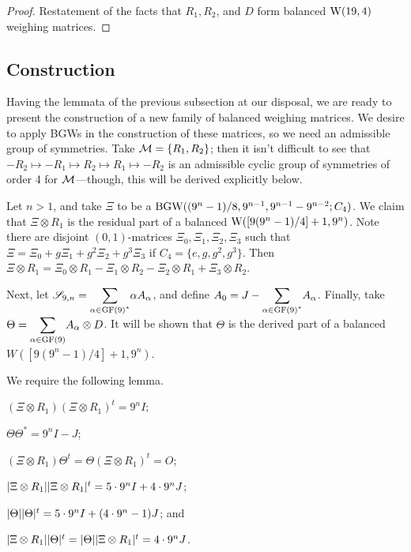 \documentclass[../../../main]{subfiles}
\begin{document}
 \begin{proof}
  Restatement of the facts that $R_1,R_2$, and $D$ form balanced $\text{W}(19,4)$ weighing matrices.
 \end{proof}
 
 \dinkus
 
\subsection{Construction}

Having the lemmata of the previous subsection at our disposal, we are ready to present the construction of a new family of balanced weighing matrices. We desire to apply BGWs in the construction of these matrices, so we need an admissible group of symmetries. Take $\mathcal{M}=\{R_1,R_2\}$; then it isn't difficult to see that $-R_2 \mapsto -R_1 \mapsto R_2 \mapsto R_1 \mapsto -R_2$ is an admissible cyclic group of symmetries of order 4 for $\mathcal{M}$---though, this will be derived explicitly below.

Let $n>1$, and take $\Xi$ to be a $\text{BGW}((9^n-1)/8,9^{n-1},9^{n-1}-9^{n-2};C_4)$. We claim that $\Xi \otimes R_1$ is the residual part of a balanced $\text{W}([9(9^n-1)/4]+1,9^n)$. Note there are disjoint $(0,1)$-matrices $\Xi_0,\Xi_1,\Xi_2,\Xi_3$ such that $\Xi = \Xi_0 + g\Xi_1 + g^2\Xi_2 + g^3\Xi_3$ if $C_4=\{e,g,g^2,g^3\}$. Then $\Xi \otimes R_1 = \Xi_0 \otimes R_1 - \Xi_1 \otimes R_2 - \Xi_2 \otimes R_1 + \Xi_3 \otimes R_2$.

Next, let $\simplex_{9,n}=\ssum_{\alpha\in\gf(9)^*}\alpha A_\alpha$, and define $A_0=J-\ssum_{\alpha\in\gf(9)^*}A_\alpha$. Finally, take $\Theta = \ssum_{\alpha\in\gf(9)} A_\alpha \otimes D$. It will be shown that $\Theta$ is the derived part of a balanced $W([9(9^n-1)/4]+1,9^n)$.

We require the following lemma.

\begin{lem}\label{bw-const-lem}
 \begin{defenum}
  \item[]
  \item\label{bw-const-lem-1} $(\Xi \otimes R_1)(\Xi \otimes R_1)^t = 9^nI$;
  \item\label{bw-const-lem-2} $\Theta\Theta^*=9^nI-J$;
  \item\label{bw-const-lem-3} $(\Xi \otimes R_1)\Theta^t = \Theta(\Xi \otimes R_1)^t = O$;
  \item\label{bw-const-lem-4} $|\Xi \otimes R_1||\Xi \otimes R_1|^t = 5 \cdot 9^nI + 4 \cdot 9^n J$;
  \item\label{bw-const-lem-5} $|\Theta||\Theta|^t = 5 \cdot 9^nI + (4 \cdot 9^n-1)J$; and
  \item\label{bw-const-lem-6} $|\Xi \otimes R_1||\Theta|^t=|\Theta||\Xi \otimes R_1|^t=4 \cdot 9^n J$.
 \end{defenum}
\end{lem}
\end{document}
